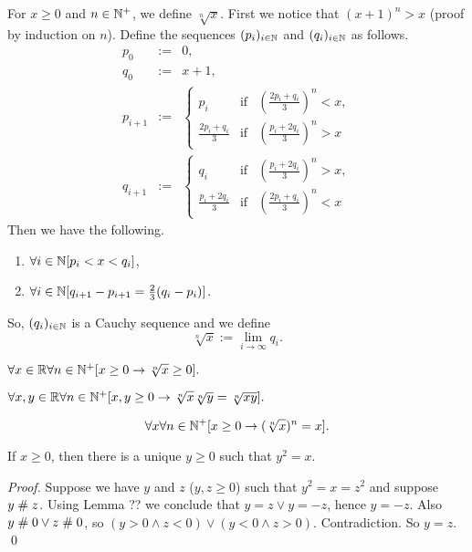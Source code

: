 \begin{definition}\label{defrootRR}
For $x\geq 0$ and $n\in\mathbb{N}^+$, we define $\sqrt[n]{x}$. First we
notice that $(x+1)^n >x$ (proof by induction on $n$). Define the
sequences $(p_i)_{i\in\mathbb{N}}$ and $(q_i)_{i\in\mathbb{N}}$ as follows.
\begin{eqnarray*}
p_0 &:=& 0,\\
q_0 &:=& x+1,\\
p_{i+1} &:=& \left\{\begin{array}{rcl}
                p_i &\mbox{if}&(\frac{2p_i + q_i}{3})^n<x,\\
                \frac{2p_i + q_i}{3} &\mbox{if}&(\frac{p_i + 2q_i}{3})^n>x
                \end{array}\right.\\
q_{i+1} &:=& \left\{\begin{array}{rcl}
                q_i &\mbox{if}&(\frac{p_i + 2q_i}{3})^n>x,\\
                \frac{p_i + 2q_i}{3} &\mbox{if}&(\frac{2p_i + q_i}{3})^n<x
                \end{array}\right.
\end{eqnarray*}
Then we have the following.
\begin{enumerate}
\item $\forall i\in \mathbb{N} [ p_i < x < q_i]$,      
\item $\forall i\in \mathbb{N} [ q_{i+1} - p_{i+1} = \frac{2}{3}(q_{i} - p_{i})]$.
\end{enumerate}
So, $(q_i)_{i\in\mathbb{N}}$ is a Cauchy sequence and we define
$$\sqrt[n]{x}:= \lim_{i\rightarrow \infty} q_i.$$ 
\end{definition}

\begin{lemma}\label{lemrtpos}
$\forall x\in\mathbb{R}\forall n\in\mathbb{N}^+[x\geq 0 \rightarrow \sqrt[n]{x} \geq 0].$
\end{lemma}

\begin{lemma}\label{lemrtmult}
$\forall x,y\in\mathbb{R}\forall n\in\mathbb{N}^+[x,y\geq 0 \rightarrow
\sqrt[n]{x}\sqrt[n]{y} = \sqrt[n]{xy}].$
\end{lemma}

\begin{lemma}\label{lemroot}
$$\forall x \forall n\in\mathbb{N}^+ [x\geq 0 \rightarrow (\sqrt[n]{x})^n = x].$$
\end{lemma}

\begin{lemma}
 If $x\geq 0$, then there is a unique $y\geq 0$ such that $y^2 = x$.
\end{lemma}

\begin{proof}
  Suppose we have $y$ and $z$ ($y,z\geq 0$) such that $y^2 = x = z^2$
  and suppose $y\mathrel{\#} z$.  Using Lemma ?? we conclude that $y=z \vee
  y= -z$, hence $y= -z$.  Also $y\mathrel{\#} 0 \vee z\mathrel{\#} 0$, so
  $(y>0\wedge z<0)\vee(y<0 \wedge z>0)$. Contradiction. So $y=z$.
  \qed
\end{proof}



